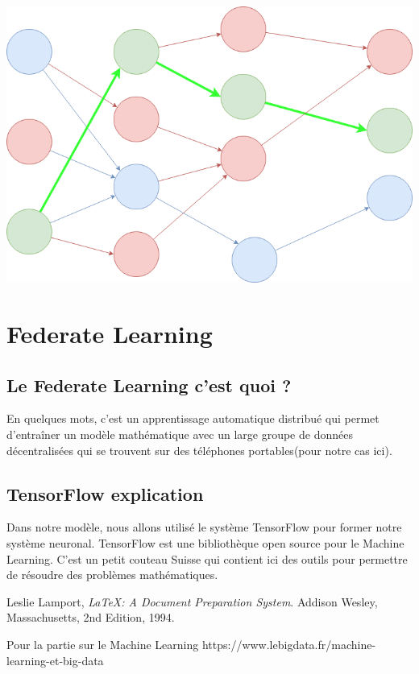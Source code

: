 \documentclass[12pt,a4paper]{report}
\begin{document}
\begin{center}
	\includegraphics[scale=0.4]{deep_learning_schema}
	\label{fig1}
\end{center}

\chapter{Federate Learning}
\section{Le Federate Learning c'est quoi ?}

En quelques mots, c'est un apprentissage automatique distribué qui permet d'entraîner un modèle mathématique avec un large groupe de données décentralisées qui se trouvent sur des téléphones portables(pour notre cas ici).

\section{TensorFlow explication}
Dans notre modèle, nous allons utilisé le système TensorFlow pour former notre système neuronal. TensorFlow est une bibliothèque open source pour le Machine Learning. C'est un petit couteau Suisse qui contient ici des outils pour permettre de résoudre des problèmes mathématiques. 



\begin{thebibliography}{9}

	  Leslie Lamport,
	  \emph{\LaTeX: A Document Preparation System}.
	  Addison Wesley, Massachusetts,
	  2nd Edition,
	  1994.
	  
	Pour la partie sur le Machine Learning https://www.lebigdata.fr/machine-learning-et-big-data

\end{thebibliography}
\end{document}
